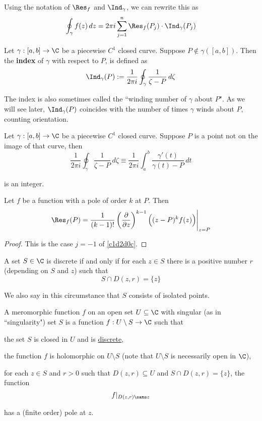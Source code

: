Using the notation of \href{ea3ff58}{$\Res_f$} and
\href{bfdcc82}{$\Ind_\gamma$}, we can rewrite this as
$$
  \oint_\gamma f(z)\,dz=2\pi i\sum_{j=1}^n\Res_f(P_j)\cdot\Ind_\gamma(P_j)
$$

\label{bfdcc82}

Let $\gamma:[a,b]\to\C$ be a piecewise $C^1$ closed curve. Suppose
$P\notin\gamma([a,b])$. Then the \textbf{index} of $\gamma$ with respect to
$P$, is defined as
$$
  \Ind_\gamma(P):=\frac1{2\pi i}\oint_\gamma\frac1{\zeta-P}\,d\zeta
$$

The index is also sometimes called the ``winding number of $\gamma$ about $P$".
As we will see later, $\Ind_\gamma(P)$ coincides with the number of times
$\gamma$ winds about $P$, counting orientation.

\label{ff34baf}

Let $\gamma:[a,b]\to\C$ be a piecewise $C^1$ closed curve. Suppose $P$ is a
point not on the image of that curve, then
$$
  \frac1{2\pi i}\oint_\gamma\frac1{\zeta-P}\,d\zeta
  \equiv
  \frac1{2\pi i}\int_a^b\frac{\gamma'(t)}{\gamma(t)-P}\,dt
$$

is an integer.

\Proposition{}\label{a264ecd}

Let $f$ be a function with a pole of order $k$ at $P$. Then
$$
  \Res_f(P)=\frac1{(k-1)!}\left(\frac\partial{\partial z}\right)^{k-1}
  \Bigl((z-P)^kf(z)\Bigr)\Bigg|_{z=P}
$$

\begin{proof}
  This is the case $j=-1$ of \autoref{c1d2d0c}.
\end{proof}

\label{d1b9ae6}

A set $S\in\C$ is discrete if and only if for each $z\in S$ there is a positive
number $r$ (depending on $S$ and $z$) such that
$$
  S\cap D(z,r)=\{z\}
$$

We also say in this circumstance that $S$ consists of isolated points.

\label{cfba843}

A meromorphic function $f$ on an open set $U\subseteq\C$ with singular (as in
``singularity") set $S$ is a function $f:U\setminus S\to\C$ such that
\begin{enumerata}
  \item the set $S$ is closed in $U$ and is \href{d1b9ae6}{discrete},
  \item the function $f$ is holomorphic on $U\setminus S$ (note that
        $U\setminus S$ is necessarily open in $\C$),
  \item for each $z\in S$ and $r>0$ such that $D(z,r)\subseteq U$ and $S\cap
        D(z,r)=\{z\}$, the function
  $$
    f|_{D(z,r)\sans z}
  $$

  has a (finite order) pole at $z$.
\end{enumerata}

